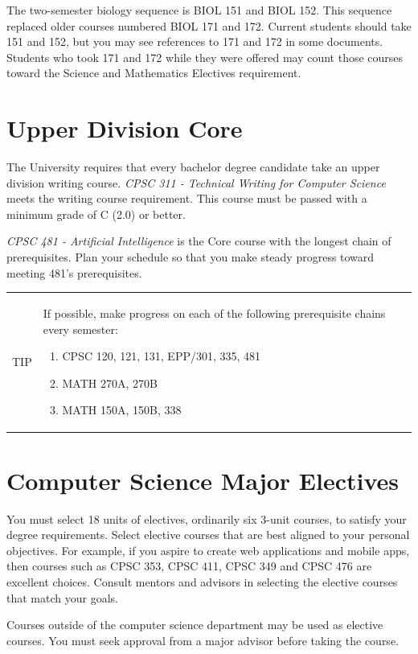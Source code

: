 \documentclass{book}
\newenvironment{tip}{
  \tcolorbox \begin{tabular}{m{.5in} m{5.25in}}
    \Large{TIP} &
}{
  \end{tabular} \endtcolorbox
}
\begin{document}
The two-semester biology sequence is BIOL 151 and BIOL 152. This
sequence replaced older courses numbered BIOL 171 and 172. Current
students should take 151 and 152, but you may see references to 171
and 172 in some documents. Students who took 171 and 172 while they
were offered may count those courses toward the Science and
Mathematics Electives requirement.

\section{Upper Division Core}

The University requires that every bachelor degree candidate take an
upper division writing course. \emph{CPSC 311 - Technical Writing for
  Computer Science} meets the writing course requirement. This course
must be passed with a minimum grade of C (2.0) or better.

\emph{CPSC 481 - Artificial Intelligence} is the Core course with the
longest chain of prerequisites. Plan your schedule so that you make
steady progress toward meeting 481's prerequisites.

\begin{tip}
  If possible, make progress on each of the following prerequisite
  chains every semester:
  \begin{enumerate}
  \item CPSC 120, 121, 131, EPP/301, 335, 481
  \item MATH 270A, 270B
  \item MATH 150A, 150B, 338
  \end{enumerate}
\end{tip}

\section{Computer Science Major Electives}
\label{section:cs_electives}
You must select 18 units of electives, ordinarily six 3-unit courses,
to satisfy your degree requirements. Select elective courses that are
best aligned to your personal objectives. For example, if you aspire
to create web applications and mobile apps, then courses such as CPSC
353, CPSC 411, CPSC 349 and CPSC 476 are excellent choices. Consult
mentors and advisors in selecting the elective courses that match your
goals.

Courses outside of the computer science department may be used as
elective courses. You must seek approval from a major advisor before
taking the course.
\end{document}
